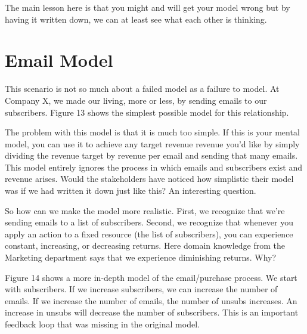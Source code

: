 \documentclass[letterpaper,10pt,english]{sphinxmanual}
\begin{document}

\begin{DUlineblock}{0em}
\item[] 
\end{DUlineblock}

The main lesson here is that you might and will get your model wrong but by having it written down, we can at least see what each other is thinking.


\section{Email Model}
\label{\detokenize{index:Email-Model}}
This scenario is not so much about a failed model as a failure to model. At Company X, we made our living, more or less, by sending emails to our subscribers. Figure 13 shows the simplest possible model for this relationship.


\begin{DUlineblock}{0em}
\item[] 
\end{DUlineblock}

The problem with this model is that it is much too simple. If this is your mental model, you can use it to achieve any target revenue revenue you’d like by simply dividing the revenue target by revenue per email and sending that many emails. This model entirely ignores the process in which emails and subscribers exist and revenue arises. Would the stakeholders have noticed how simplistic their model was if we had written it down just like this? An interesting question.

So how can we make the model more realistic. First, we recognize that we’re sending emails to a list of subscribers. Second, we recognize that whenever you apply an action to a fixed resource (the list of subscribers), you can experience constant, increasing, or decreasing returns. Here domain knowledge from the Marketing department says that we experience diminishing returns. Why?

Figure 14 shows a more in-depth model of the email/purchase process. We start with subscribers. If we increase subscribers, we can increase the number of emails. If we increase the number of emails, the number of unsubs increases. An increase in unsubs will decrease the number of subscribers. This is an important feedback loop that was missing in the original model.
\end{document}

